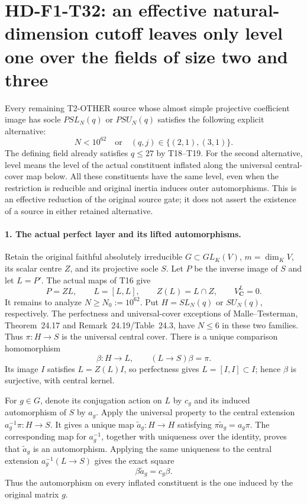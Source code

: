 \section[HD-F1-T32: effective linear and unitary level reduction]{HD-F1-T32: an effective natural-dimension cutoff leaves only level one over the fields of size two and three}
\label{sec:f1-large-dimension-character-level-reduction}

Every remaining T2-OTHER source whose almost simple projective
coefficient image has socle \(PSL_N(q)\) or \(PSU_N(q)\) satisfies
the following explicit alternative:
\[
 \boxed{\quad N<10^{62}\quad\text{or}\quad
                  (q,j)\in\{(2,1),(3,1)\}.\quad}
 \tag{F1T32.1}
\]
The defining field already satisfies \(q\le27\) by T18--T19.
For the second alternative, level means the level of the
actual constituent inflated along the universal central-cover
map below. All these constituents have the same level, even
when the restriction is reducible and original inertia induces
outer automorphisms. This is an effective reduction of the
original source gate; it does not assert the existence of a
source in either retained alternative.

\paragraph{1. The actual perfect layer and its lifted automorphisms.}
Retain the original faithful absolutely irreducible
\(G\subset GL_K(V)\), \(m=\dim_KV\), its scalar centre
\(Z\), and its projective socle \(S\). Let \(P\) be the
inverse image of \(S\) and let \(L=P'\). The actual maps
of T16 give
\[
 P=ZL,\qquad L=[L,L],\qquad Z(L)=L\cap Z,
 \qquad V_{\mathbf C}^{L}=0.
 \tag{F1T32.2}
\]
It remains to analyze \(N\ge N_0:=10^{62}\).
Put \(H=SL_N(q)\) or \(SU_N(q)\), respectively.
The perfectness and universal-cover exceptions of
Malle--Testerman, Theorem~24.17 and
Remark~24.19/Table~24.3, have \(N\le6\) in these two
families. Thus \(\pi:H\to S\) is the universal central
cover. There is a unique comparison homomorphism
\[
 \beta:H\longrightarrow L,\qquad
       (L\longrightarrow S)\beta=\pi.
 \tag{F1T32.3}
\]
Its image \(I\) satisfies \(L=Z(L)I\), so perfectness
gives \(L=[I,I]\subset I\); hence \(\beta\) is
surjective, with central kernel.

For \(g\in G\), denote its conjugation action on \(L\)
by \(c_g\) and its induced automorphism of \(S\) by
\(a_g\). Apply the universal property to the central
extension \(a_g^{-1}\pi:H\to S\). It gives a unique map
\(\widetilde a_g:H\to H\) satisfying
\(\pi\widetilde a_g=a_g\pi\). The corresponding map
for \(a_g^{-1}\), together with uniqueness over the
identity, proves that \(\widetilde a_g\) is an
automorphism. Applying the same uniqueness to the central
extension \(a_g^{-1}(L\to S)\) gives the exact square
\[
                  \beta\widetilde a_g=c_g\beta.
 \tag{F1T32.4}
\]
Thus the automorphism on every inflated constituent is
the one induced by the original matrix \(g\).

